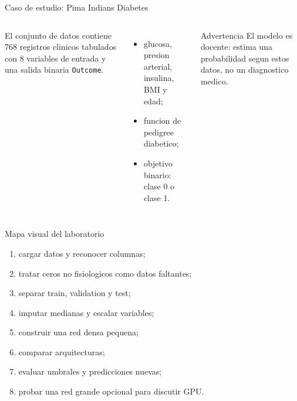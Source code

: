 \begin{frame}{Caso de estudio: Pima Indians Diabetes}
\begin{columns}[T,onlytextwidth]
\justifying
El conjunto de datos contiene 768 registros clinicos tabulados con 8 variables de entrada y una salida binaria \texttt{Outcome}.
\begin{itemize}
    \item glucosa, presion arterial, insulina, BMI y edad;
    \item funcion de pedigree diabetico;
    \item objetivo binario: clase 0 o clase 1.
\end{itemize}

\begin{alertblock}{Advertencia}
El modelo es docente: estima una probabilidad segun estos datos, no un diagnostico medico.
\end{alertblock}

\centering
{}
\end{columns}
\end{frame}

\begin{frame}{Mapa visual del laboratorio}
\begin{enumerate}
    \item cargar datos y reconocer columnas;
    \item tratar ceros no fisiologicos como datos faltantes;
    \item separar train, validation y test;
    \item imputar medianas y escalar variables;
    \item construir una red densa pequena;
    \item comparar arquitecturas;
    \item evaluar umbrales y predicciones nuevas;
    \item probar una red grande opcional para discutir GPU.
\end{enumerate}
\end{frame}

